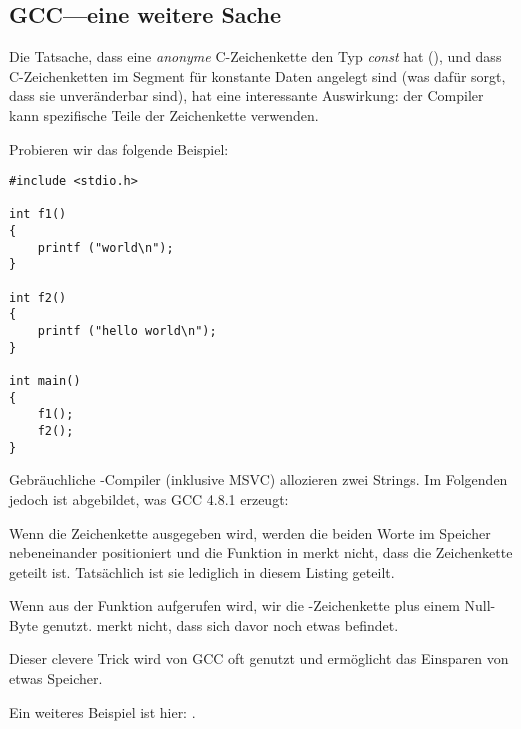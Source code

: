 \subsection{GCC---eine weitere Sache}
\label{use_parts_of_C_strings}

Die Tatsache, dass eine \emph{anonyme} C-Zeichenkette den Typ \emph{const} hat (), 
und dass C-Zeichenketten im Segment für konstante Daten angelegt sind (was dafür sorgt, dass sie unveränderbar sind),
hat eine interessante Auswirkung: der Compiler kann spezifische Teile der Zeichenkette verwenden.

Probieren wir das folgende Beispiel:

\begin{lstlisting}[style=customc]
#include <stdio.h>

int f1()
{
	printf ("world\n");
}

int f2()
{
	printf ("hello world\n");
}

int main()
{
	f1();
	f2();
}
\end{lstlisting}

Gebräuchliche \CCpp{}-Compiler (inklusive MSVC) allozieren zwei Strings.
Im Folgenden jedoch ist abgebildet, was GCC 4.8.1 erzeugt:



Wenn die Zeichenkette  ausgegeben wird, werden die beiden Worte im Speicher nebeneinander
positioniert und die Funktion \puts in  merkt nicht, dass die Zeichenkette geteilt ist.
Tatsächlich ist sie lediglich  in diesem Listing geteilt.

Wenn \puts aus der Funktion  aufgerufen wird, wir die -Zeichenkette plus einem Null-Byte
genutzt. \puts merkt nicht, dass sich davor noch etwas befindet.

Dieser clevere Trick wird von GCC oft genutzt und ermöglicht das Einsparen von etwas Speicher.

Ein weiteres Beispiel ist hier: .

